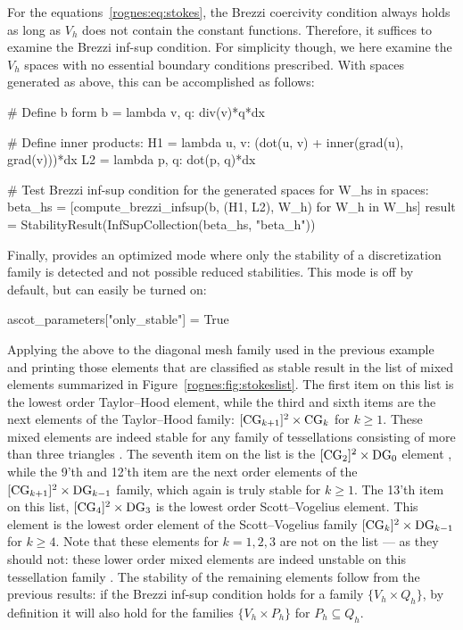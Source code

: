 For the equations~\eqref{rognes:eq:stokes}, the Brezzi coercivity
condition always holds as long as $V_h$ does not contain the constant
functions. Therefore, it suffices to examine the Brezzi inf-sup
condition. For simplicity though, we here examine the $V_h$ spaces
with no essential boundary conditions prescribed. With spaces
generated as above, this can be accomplished as follows:
\begin{python}
# Define b form
b = lambda v, q: div(v)*q*dx

# Define inner products:
H1 = lambda u, v: (dot(u, v) + inner(grad(u), grad(v)))*dx
L2 = lambda p, q: dot(p, q)*dx

# Test Brezzi inf-sup condition for the generated spaces
for W_hs in spaces:
    beta_hs = [compute_brezzi_infsup(b, (H1, L2), W_h) for W_h in W_hs]
    result = StabilityResult(InfSupCollection(beta_hs, "beta_h"))
\end{python}
Finally, \rognesascot{} provides an optimized mode where only the
stability of a discretization family is detected and not possible
reduced stabilities. This mode is off by default, but can easily be
turned on:
\begin{python}
ascot_parameters["only_stable"] = True
\end{python}

Applying the above to the diagonal mesh family used in the previous
example and printing those elements that are classified as stable
result in the list of mixed elements summarized in
Figure~\ref{rognes:fig:stokeslist}. The first item on this list is the
lowest order Taylor--Hood element, while the third and sixth items are
the next elements of the Taylor--Hood family:
$[\mathrm{CG}_{k+1}]^{2} \times \mathrm{CG}_{k}$ for $k \geqslant
1$. These mixed elements are indeed stable for any family of
tessellations consisting of more than three
triangles \citep{TaylorHood1973, Stenberg1984, BrezziFalk1991}. The
seventh item on the list is the
$[\mathrm{CG}_{2}]^{2} \times \mathrm{DG}_{0}$
element \citep{CrouzeixRaviart1973}, while the 9'th and 12'th item are
the next order elements of the $[\mathrm{CG}_{k+1}]^{2} \times
\mathrm{DG}_{k-1}$ family, which again is truly stable for $k \geqslant
1$. The 13'th item on this list, $[\mathrm{CG}_{4}]^{2} \times
\mathrm{DG}_{3}$ is the lowest order Scott--Vogelius element. This element
is the lowest order element of the Scott--Vogelius family
$[\mathrm{CG}_{k}]^{2} \times \mathrm{DG}_{k-1}$ for $k \geqslant
4$. Note that these elements for $k = 1, 2, 3$ are not on the list ---
as they should not: these lower order mixed elements are indeed
unstable on this tessellation family \citep{Qin1994}. The stability of
the remaining elements follow from the previous results: if the Brezzi
inf-sup condition holds for a family $\{V_h \times Q_h\}$, by
definition it will also hold for the families $\{V_h \times P_h\}$ for
$P_h \subseteq Q_h$.

